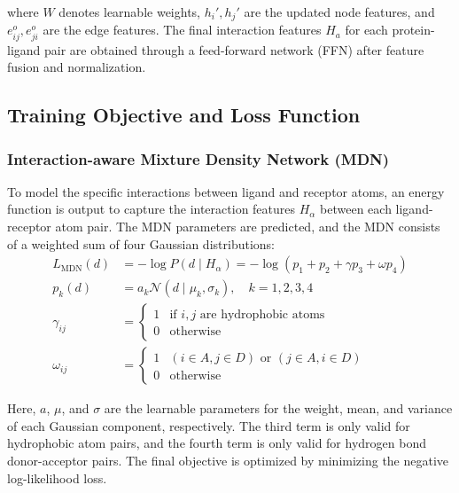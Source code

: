 \documentclass[lettersize,journal]{IEEEtran}
\begin{document}
where $W$ denotes learnable weights, $h_{i}',h_{j}'$ are the updated
node features, and $e_{ij}^{o},e_{ji}^{o}$ are the edge features. The
final interaction features $H_{a}$ for each protein-ligand pair are
obtained through a feed-forward network (FFN) after feature fusion and
normalization.

\subsection{Training Objective and Loss Function}
\subsubsection{Interaction-aware Mixture Density Network (MDN)\cite{bishop1994mixture}}
To model the specific interactions between ligand and receptor atoms, an
energy function is output to capture the
interaction features $H_{\alpha}$ between each ligand-receptor atom
pair. The MDN parameters are predicted, and the MDN consists of a
weighted sum of four Gaussian distributions:
\begin{equation}
\begin{aligned}
L_{\text{MDN}}(d) &= -\log P\left( d \mid H_{\alpha} \right) = -\log\left( p_{1} + p_{2} + \gamma p_{3} + \omega p_{4} \right) \\
p_{k}(d) &= a_{k} \mathcal{N} \left( d \mid \mu_{k}, \sigma_{k} \right), \quad k = 1,2,3,4 \\
\gamma_{ij} &= 
\begin{cases} 
1 & \text{if } i,j \text{ are hydrophobic atoms} \\
0 & \text{otherwise}
\end{cases} \\
\omega_{ij} &= 
\begin{cases} 
1 & (i \in A, j \in D) \text{ or } (j \in A, i \in D) \\
0 & \text{otherwise}
\end{cases}
\end{aligned}
\end{equation}

Here, $a$, $\mu$, and $\sigma$ are the learnable parameters for the
weight, mean, and variance of each Gaussian component, respectively. The
third term is only valid for hydrophobic atom pairs, and the fourth term
is only valid for hydrogen bond donor-acceptor pairs. The final
objective is optimized by minimizing the negative log-likelihood loss.


\balance

\end{document}
